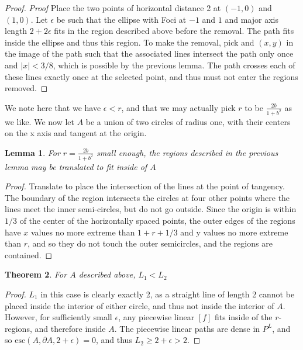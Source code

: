 \documentclass{journal}
\newtheorem{thm}{Theorem}[section]    %
\newtheorem{lem}[thm]{Lemma}          %
\theoremstyle{definition}
\begin{document}
\begin{proof}
    \textit{Proof}
Place the two points of horizontal distance 2 at $(-1,0)$ and $(1,0)$. Let $\epsilon$ be such that the ellipse with Foci at $-1$ and $1$ and major axis length $2+2\epsilon$ fits in the region described above before the removal. The path fits inside the ellipse and thus this region. To make the removal, pick and $(x,y)$ in the image of the path such that the associated lines intersect the path only once and $|x| < 3/8$, which is possible by the previous lemma. The path crosses each of these lines exactly once at the selected point, and thus must not enter the regions removed. 
\end{proof}
We note here that we have $\epsilon < r$, and that we may actually pick $r$ to be $\frac{2b}{1+b^2}$ as we like. We now let $A$ be a union of two circles of radius one, with their centers on the x axis and tangent at the origin.

\begin{lem}
    For $r= \frac{2b}{1+b^2}$ small enough, the regions described in the previous lemma may be translated to fit inside of $A$
\end{lem}
\label{lem:translation}

\begin{proof}
    Translate to place the intersection of the lines at the point of tangency. The boundary of the region intersects the circles at four other points where the lines meet the inner semi-circles, but do not go outside. Since the origin is within $1/3$ of the center of the horizontally spaced points, the outer edges of the regions have $x$ values no more extreme than $1+r + 1/3$ and y values no more extreme than $r$, and so they do not touch the outer semicircles, and the regions are contained.
\end{proof}

\begin{thm}
    For $A$ described above, $L_1 < L_2$
\end{thm}

\begin{proof}
$L_1$ in this case is clearly exactly 2, as a straight line of length 2 cannot be placed inside the interior of either circle, and thus not inside the interior of $A$. 
However, for sufficiently small $\epsilon$, any piecewise linear $[f]$ fits inside of the $r$-regions, and therefore inside $A$. The piecewise linear paths are dense in $P^L$, and so $\mathrm{esc}(A,\partial A, 2+\epsilon) = 0$, and thus $L_2 \geq 2+\epsilon > 2$.
\end{proof}
\end{document}
